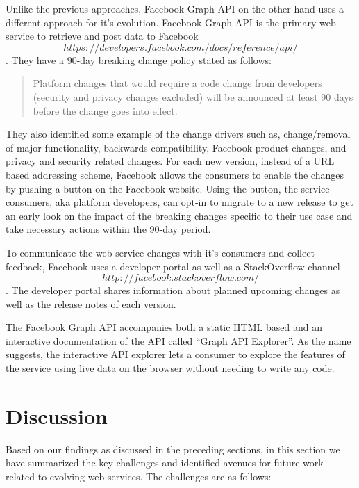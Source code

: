 \documentclass[runningheads,a4paper]{llncs}
\begin{document}
Unlike the previous approaches, Facebook Graph API on the other hand uses a different approach for it’s evolution. Facebook Graph API is the primary web service to retrieve and post data to Facebook \[https://developers.facebook.com/docs/reference/api/\]. They have a 90-day breaking change policy stated as follows:

\begin{quote}
Platform changes that would require a code change from developers (security and privacy changes excluded) will be announced at least 90 days before the change goes into effect.
\end{quote}

They also identified some example of the change drivers such as, change/removal of major functionality, backwards compatibility, Facebook product changes, and privacy and security related changes. For each new version, instead of a URL based addressing scheme, Facebook allows the consumers to enable the changes by pushing a button on the Facebook website. Using the button, the service consumers, aka platform developers, can opt-in to migrate to a new release to get an early look on the impact of the breaking changes specific to their use case and take necessary actions within the 90-day period.

To communicate the web service changes with it’s consumers and collect feedback, Facebook uses a developer portal as well as a StackOverflow channel \[http://facebook.stackoverflow.com/\]. The developer portal shares information about planned upcoming changes as well as the release notes of each version.

The Facebook Graph API accompanies both a static HTML based and an interactive documentation of the API called ``Graph API Explorer''. As the name suggests, the interactive API explorer lets a consumer to explore the features of the service using live data on the browser without needing to write any code.



\section{Discussion} %
\label{sec:discussion}

Based on our findings as discussed in the preceding sections, in this section we have summarized the key challenges and identified avenues for future work related to evolving web services. The challenges are as follows:
\end{document}
